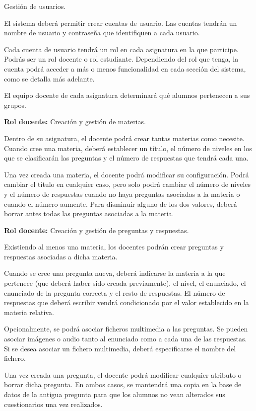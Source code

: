 \begin{rf0}

	\item Gestión de usuarios.
			\begin{rf0*}
				\item El sistema deberá permitir crear cuentas de usuario. Las cuentas tendrán un nombre de usuario y contraseña que identifiquen a cada usuario.
				\item Cada cuenta de usuario tendrá un rol en cada asignatura en la que participe. Podrás ser un rol docente o rol estudiante. Dependiendo del rol que tenga, la cuenta podrá acceder a más o menos funcionalidad en cada sección del sistema, como se detalla más adelante.
				\item El equipo docente de cada asignatura determinará qué alumnos pertenecen a sus grupos.
			\end{rf0*} 

	\item \textbf{Rol docente:} Creación y gestión de materias.
			\begin{rf0*}
				\item Dentro de su asignatura, el docente podrá crear tantas materias como necesite. Cuando cree una materia, deberá establecer un título, el número de niveles en los que se clasificarán las preguntas y el número de respuestas que tendrá cada una.
				\item Una vez creada una materia, el docente podrá modificar su configuración. Podrá cambiar el título en cualquier caso, pero solo podrá cambiar el número de niveles y el número de respuestas cuando no haya preguntas asociadas a la materia o cuando el número aumente. Para disminuir alguno de los dos valores, deberá borrar antes todas las preguntas asociadas a la materia.
			\end{rf0*}

	\item \textbf{Rol docente:} Creación y gestión de preguntas y respuestas.
		\begin{rf0*}
			\item Existiendo al menos una materia, los docentes podrán crear preguntas y respuestas asociadas a dicha materia.
			\item Cuando se cree una pregunta nueva, deberá indicarse la materia a la que pertenece (que deberá haber sido creada previamente), el nivel, el enunciado, el enunciado de la pregunta correcta y el resto de respuestas. El número de respuestas que deberá escribir vendrá condicionado por el valor establecido en la materia relativa.
			\item Opcionalmente, se podrá asociar ficheros multimedia a las preguntas. Se pueden asociar imágenes o audio tanto al enunciado como a cada una de las respuestas. Si se desea asociar un fichero multimedia, deberá especificarse el nombre del fichero.
			\item Una vez creada una pregunta, el docente podrá modificar cualquier atributo o borrar dicha pregunta. En ambos casos, se mantendrá una copia en la base de datos de la antigua pregunta para que los alumnos no vean alterados sus cuestionarios una vez realizados.
		\end{rf0*}
	

\end{rf0}
